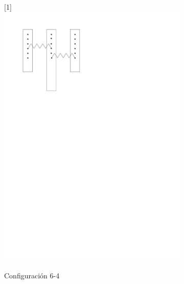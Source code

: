 \begin{figure}[htbp!]
	\begin{subfigure}[b]{0.3\textwidth}
		\centering
		\scalebox{-1}[1]{\includegraphics[width=\linewidth]{./Figures/46.pdf}}
		\caption{Configuración 6-4}
		\label{fig:conf-4-6}
	\end{subfigure}
	\hspace{0.1\textwidth}
	\begin{subfigure}[b]{0.3\textwidth}
		\centering

\end{subfigure}
\end{figure}
